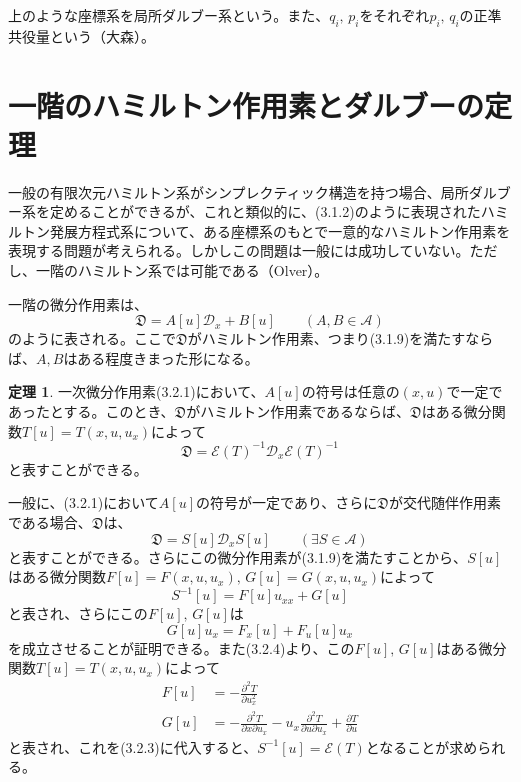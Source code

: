 \documentclass[a4paper, 11pt]{report}
\theoremstyle{definition}
\newtheorem{theorem}{定理}[section]
\begin{document}
 上のような座標系を局所ダルブー系という。また、$q_i, \, p_i$をそれぞれ$p_i, \, q_i$の正凖共役量という（大森\cite[Chap.3]{Omori}）。

\section{一階のハミルトン作用素とダルブーの定理}

 一般の有限次元ハミルトン系がシンプレクティック構造を持つ場合、局所ダルブー系を定めることができるが、これと類似的に、(3.1.2)のように表現されたハミルトン発展方程式系について、ある座標系のもとで一意的なハミルトン作用素を表現する問題が考えられる。しかしこの問題は一般には成功していない。ただし、一階のハミルトン系では可能である（Olver\cite[Chap.6]{Olver5}）。

 一階の微分作用素は、
\begin{equation}
\mathfrak{D} = A[u]\mathcal{D}_x + B[u] \qquad (A, B\in\mathcal{A})  %
\end{equation}
のように表される。ここで$\mathfrak{D}$がハミルトン作用素、つまり(3.1.9)を満たすならば、$A,B$はある程度きまった形になる。

\begin{theorem}
 一次微分作用素(3.2.1)において、$A[u]$の符号は任意の$(x,u)$で一定であったとする。このとき、$\mathfrak{D}$がハミルトン作用素であるならば、$\mathfrak{D}$はある微分関数$T[u]=T(x,u,u_x)$によって
\begin{equation}
\mathfrak{D} = \mathcal{E}(T)^{-1}\mathcal{D}_x\mathcal{E}(T)^{-1}  %
\end{equation}
と表すことができる。
\end{theorem}

 一般に、(3.2.1)において$A[u]$の符号が一定であり、さらに$\mathfrak{D}$が交代随伴作用素である場合、$\mathfrak{D}$は、
\begin{equation*}
\mathfrak{D} = S[u]\mathcal{D}_xS[u] \qquad (\exists S\in\mathcal{A})
\end{equation*}
と表すことができる。さらにこの微分作用素が(3.1.9)を満たすことから、$S[u]$はある微分関数$F[u]=F(x,u,u_x), \, G[u]=G(x,u,u_x)$によって
\begin{equation}
S^{-1}[u] = F[u]u_{xx} + G[u]  %
\end{equation}
と表され、さらにこの$F[u], \, G[u]$は
\begin{equation}
G[u]u_x = F_x[u] + F_u[u]u_x  %
\end{equation}
を成立させることが証明できる。また(3.2.4)より、この$F[u], \, G[u]$はある微分関数$T[u]=T(x,u,u_x)$によって
\begin{align*}
F[u] &= -\frac{\partial ^2T}{\partial u_x^2}\\
G[u] &= -\frac{\partial ^2T}{\partial x\partial u_x}-u_x\frac{\partial ^2T}{\partial u\partial u_x}+\frac{\partial T}{\partial u}
\end{align*}
と表され、これを(3.2.3)に代入すると、$S^{-1}[u]=\mathcal{E}(T)$となることが求められる。
\end{document}
